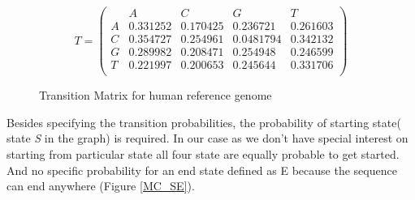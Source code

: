 \documentclass[11pt,a4paper]{report}
\begin{document}


\begin{figure}[H]
 \centering
\[
T = 
 \begin{pmatrix}
   &  A  & C & G & T  \\
 A & 0.331252 & 0.170425 & 0.236721 & 0.261603  \\
 C & 0.354727 & 0.254961 & 0.0481794 & 0.342132  \\
 G & 0.289982 & 0.208471 & 0.254948 & 0.246599  \\
 T & 0.221997 & 0.200653 & 0.245644 & 0.331706 \\
  
 \end{pmatrix}
\]
 \caption{Transition Matrix for human reference genome}
 \label{transition-matrix}
\end{figure}

Besides specifying the transition probabilities, the probability of starting 
state( state \emph{S} in the graph) is required. In our case as we don't have
special interest on starting from particular state all four state are equally 
probable to get started. And no specific probability for an end state defined as 
E because the sequence can end anywhere (Figure \ref{MC_SE}).
\end{document}
